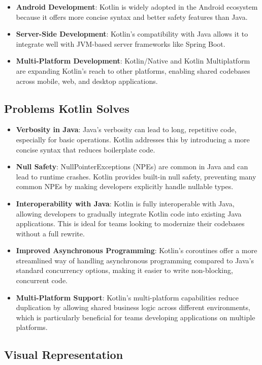 \begin{itemize}
    \item \textbf{Android Development}: Kotlin is widely adopted in the Android ecosystem because it offers more concise syntax and better safety features than Java.
    \item \textbf{Server-Side Development}: Kotlin’s compatibility with Java allows it to integrate well with JVM-based server frameworks like Spring Boot.
    \item \textbf{Multi-Platform Development}: Kotlin/Native and Kotlin Multiplatform are expanding Kotlin's reach to other platforms, enabling shared codebases across mobile, web, and desktop applications.
\end{itemize}

\subsection{Problems Kotlin Solves}

\begin{itemize}
    \item \textbf{Verbosity in Java}: Java's verbosity can lead to long, repetitive code, especially for basic operations. Kotlin addresses this by introducing a more concise syntax that reduces boilerplate code.
    \item \textbf{Null Safety}: NullPointerExceptions (NPEs) are common in Java and can lead to runtime crashes. Kotlin provides built-in null safety, preventing many common NPEs by making developers explicitly handle nullable types.
    \item \textbf{Interoperability with Java}: Kotlin is fully interoperable with Java, allowing developers to gradually integrate Kotlin code into existing Java applications. This is ideal for teams looking to modernize their codebases without a full rewrite.
    \item \textbf{Improved Asynchronous Programming}: Kotlin’s coroutines offer a more streamlined way of handling asynchronous programming compared to Java’s standard concurrency options, making it easier to write non-blocking, concurrent code.
    \item \textbf{Multi-Platform Support}: Kotlin's multi-platform capabilities reduce duplication by allowing shared business logic across different environments, which is particularly beneficial for teams developing applications on multiple platforms.
\end{itemize}

\subsection{Visual Representation}

